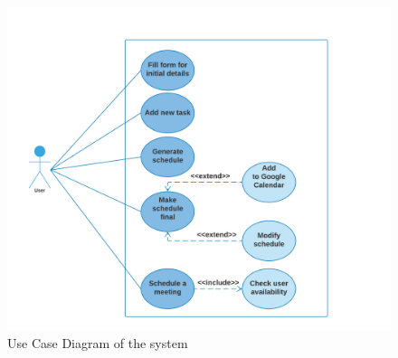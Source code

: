 \documentclass{sig-alternate-05-2015}
\begin{document}
\begin{figure}[!htbp]
\includegraphics[scale = 0.32]{Use_Case_Diagram}
\centering
\caption{Use Case Diagram of the system}
\end{figure}
\FloatBarrier
\end{document}
